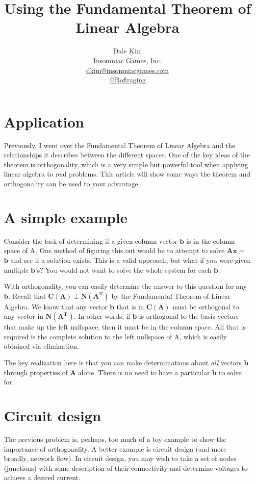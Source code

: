 \documentclass[11pt]{article} %
\title{Using the Fundamental Theorem of Linear Algebra}
\author{Dale Kim\\Insomniac Games, Inc.\\\href{mailto:dkim@insomniacgames.com}{dkim@insomniacgames.com} \\\faTwitter \href{https://twitter.com/roflraging}{@Roflraging}}
\begin{document}
\maketitle

\section{Application}
Previously, I went over the Fundamental Theorem of Linear Algebra and
the relationships it describes between the different spaces.  One of
the key ideas of the theorem is orthogonality, which is a very simple
but powerful tool when applying linear algebra to real problems.  This
article will show some ways the theorem and orthogonality can be used
to your advantage.

\section{A simple example}
Consider the task of determining if a given column vector $\bm{b}$ is
in the column space of A.  One method of figuring this out would be to
attempt to solve $\bm{Ax}$ = $\bm{b}$ and see if a solution exists.
This is a valid approach, but what if you were given multiple
$\bm{b}$'s?  You would not want to solve the whole system for each
$\bm{b}$.

With orthogonality, you can easily determine the answer to this
question for any $\bm{b}$.  Recall that $\bm{C(A)}\perp\bm{N(A^T)}$ by
the Fundamental Theorem of Linear Algebra.  We know that any vector
$\bm{b}$ that is in $\bm{C(A)}$ must be orthogonal to any vector in
$\bm{N(A^T)}$.  In other words, if $\bm{b}$ is orthogonal to the basis
vectors that make up the left nullspace, then it must be in the column
space.  All that is required is the complete solution to the left
nullspace of A, which is easily obtained via elimination.

The key realization here is that you can make determinations about
\textit{all} vectors $\bm{b}$ through properties of $\bm{A}$ alone.
There is no need to have a particular $\bm{b}$ to solve for.

\section{Circuit design}
The previous problem is, perhaps, too much of a toy example to show
the importance of orthogonality.  A better example is circuit design
(and more broadly, network flow).  In circuit design, you may wish to
take a set of nodes (junctions) with some description of their
connectivity and determine voltages to achieve a desired current.
\end{document}
